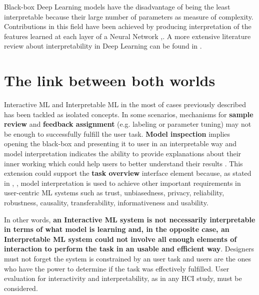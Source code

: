 Black-box Deep Learning models have the disadvantage of being the least interpretable because their large number of parameters as measure of complexity. Contributions in this field have been achieved by producing interpretation of the features learned at each layer of a Neural Network \cite{Yosinski2015a},\cite{Olah2018}. A more extensive literature review about interpretability in Deep Learning can be found in \cite{Zhang2018}.

\section{The link between both worlds}
\label{section2.3}

Interactive ML and Interpretable ML in the most of cases previously described has been tackled as isolated concepts. In some scenarios, mechanisms for \textbf{sample review} and \textbf{feedback assignment} (e.g. labeling or parameter tuning) may not be enough to successfully fulfill the user task. \textbf{Model inspection} implies opening the black-box and presenting it to user in an interpretable way and model interpretation indicates the ability to provide explanations about their inner working which could help users to better understand their results \cite{Doshi-Velez2017c}. This extension could support the \textbf{task overview} interface element because, as stated in \cite{Doshi-Velez2017c}, \cite{Lipton2017}, model interpretation is used to achieve other important requirements in user-centric ML systems such as trust, unbiasedness, privacy, reliability, robustness, causality, transferability, informativeness and usability.

In other words, \textbf{an Interactive ML system is not necessarily interpretable in terms of what model is learning and, in the opposite case, an Interpretable ML system could not involve all enough elements of interaction to perform the task in an usable and efficient way}. Designers must not forget the system is constrained by an user task and users are the ones who have the power to determine if the task was effectively fulfilled. User evaluation for interactivity and interpretability, as in any HCI study, must be considered.
